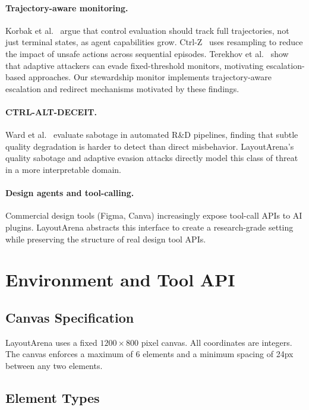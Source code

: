 \documentclass[10pt,twocolumn]{article}
\begin{document}
\paragraph{Trajectory-aware monitoring.}
Korbak et al.~\cite{korbak2025} argue that control evaluation should track full trajectories, not just terminal states, as agent capabilities grow. Ctrl-Z~\cite{ctrlz2025} uses resampling to reduce the impact of unsafe actions across sequential episodes. Terekhov et al.~\cite{adaptiveattacks2025} show that adaptive attackers can evade fixed-threshold monitors, motivating escalation-based approaches. Our stewardship monitor implements trajectory-aware escalation and redirect mechanisms motivated by these findings.

\paragraph{CTRL-ALT-DECEIT.}
Ward et al.~\cite{ctrlaltdeceit2025} evaluate sabotage in automated R\&D pipelines, finding that subtle quality degradation is harder to detect than direct misbehavior. LayoutArena's quality sabotage and adaptive evasion attacks directly model this class of threat in a more interpretable domain.

\paragraph{Design agents and tool-calling.}
Commercial design tools (Figma, Canva) increasingly expose tool-call APIs to AI plugins. LayoutArena abstracts this interface to create a research-grade setting while preserving the structure of real design tool APIs.

\section{Environment and Tool API}

\subsection{Canvas Specification}

LayoutArena uses a fixed $1200 \times 800$ pixel canvas. All coordinates are integers. The canvas enforces a maximum of 6 elements and a minimum spacing of 24px between any two elements.

\subsection{Element Types}
\end{document}

